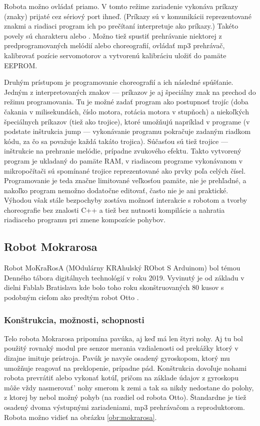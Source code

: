 Robota možno ovládať priamo. V tomto režime zariadenie vykonáva príkazy (znaky) prijaté cez sériový port ihneď. (Príkazy sú v komunikácii reprezentované znakmi a riadiaci program ich po prečítaní interpretuje ako príkazy.) Takéto povely sú charakteru  alebo . Možno tiež spustiť prehrávanie niektorej z predprogramovaných melódií alebo choreografií, ovládať mp3 prehrávač, kalibrovať pozície servomotorov a vytvorenú kalibráciu uložiť do pamäte EEPROM.

Druhým prístupom je programovanie choreografií a ich následné spúšťanie. Jedným z interpretovaných znakov --- príkazov je aj špeciálny znak na prechod do režimu programovania. Tu je možné zadať program ako postupnosť trojíc (doba čakania v milisekundách, číslo motora, rotácia motora v stupňoch) a niekoľkých špeciálnych príkazov (tiež ako trojice), ktoré umožňujú napríklad  v programe (v podstate inštrukcia jump --- vykonávanie programu pokračuje zadaným riadkom kódu, za čo sa považuje každá takáto trojica). Súčasťou sú tiež trojice --- inštrukcie na prehranie melódie, prípadne zvukového efektu. Takto vytvorený program je ukladaný do pamäte RAM, v riadiacom programe vykonávanom v mikropočítači sú spomínané trojice reprezentované ako prvky poľa celých čísel. Programovanie je teda značne limitované veľkosťou pamäte, nie je prehľadné, a nakoľko program nemožno dodatočne editovať, často nie je ani praktické. Výhodou však stále bezpochyby zostáva možnosť interakcie s robotom a tvorby choreografie bez znalosti C++ a tiež bez nutnosti kompilácie a nahratia riadiaceho programu pri zmene kompozície pohybov.

\subsection{Robot Mokrarosa}
Robot MoKraRosA (MOdulárny KRAhulský RObot S Arduinom) bol témou Denného tábora digitálnych technológií v roku 2019. Vyvinutý je od základu v dielni Fablab Bratislava kde bolo toho roku skonštruovaných 80 kusov s podobným cieľom ako predtým robot Otto \cite{Mokrarosa}.

\subsubsection{Konštrukcia, možnosti, schopnosti}
Telo robota Mokrarosa pripomína pavúka, aj keď má len štyri nohy. Aj tu bol použitý rovnaký modul pre senzor merania vzdialenosti od prekážky ktorý v dizajne imituje  prístroja. Pavúk je navyše osadený gyroskopom, ktorý mu umožňuje reagovať na preklopenie, prípadne pád. Konštrukcia dovoľuje nohami robota prevrátiť alebo vykonať kotúľ, pričom na základe údajov z gyroskopu môže vždy nasmerovať' nohy smerom k zemi a tak sa nikdy nedostane do polohy, z ktorej by nebol možný pohyb (na rozdiel od robota Otto). Štandardne je tiež osadený dvoma výstupnými zariadeniami, mp3 prehrávačom a reproduktorom. Robota možno vidieť na obrázku \ref{obr:mokrarosa}.

